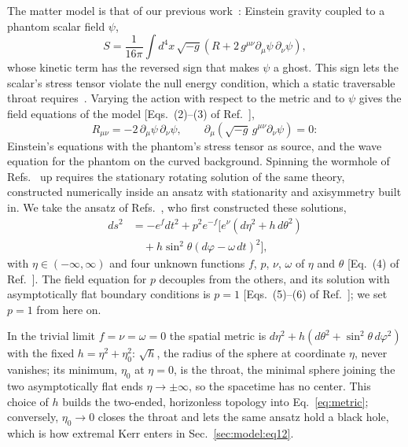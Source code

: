 \documentclass[twocolumn,floatfix,aps,prd,superscriptaddress,nofootinbib]{revtex4-2}
\begin{document}
The matter model is that of our previous work~\cite{shirokov2026,shirokov2026c}: Einstein gravity coupled to a phantom scalar field $\psi$,
\begin{equation}
S=\frac{1}{16\pi}\int d^4x\,\sqrt{-g}\left(R+2\,g^{\mu\nu}\partial_\mu\psi\,\partial_\nu\psi\right),
\label{eq:action}
\end{equation}
whose kinetic term has the reversed sign that makes $\psi$ a ghost. This sign lets the scalar's stress tensor violate the null energy condition, which a static traversable throat requires~\cite{morris_thorne1988,visser1995}. Varying the action with respect to the metric and to $\psi$ gives the field equations of the model [Eqs.~(2)--(3) of Ref.~\cite{chew2016}],
\begin{equation}
R_{\mu\nu}=-2\,\partial_\mu\psi\,\partial_\nu\psi,\qquad
\partial_\mu\!\left(\sqrt{-g}\,g^{\mu\nu}\partial_\nu\psi\right)=0:
\label{eq:fieldeqs}
\end{equation}
Einstein's equations with the phantom's stress tensor as source, and the wave equation for the phantom on the curved background. Spinning the wormhole of Refs.~\cite{shirokov2026,shirokov2026c} up requires the stationary rotating solution of the same theory, constructed numerically inside an ansatz with stationarity and axisymmetry built in. We take the ansatz of Refs.~\cite{kleihaus_kunz2014,chew2016}, who first constructed these solutions,
\begin{equation}
\begin{split}
ds^2&=-e^{f}dt^2+p^2e^{-f}\Big[e^{\nu}\left(d\eta^2+h\,d\theta^2\right)\\
&\quad+h\sin^2\!\theta\left(d\varphi-\omega\,dt\right)^2\Big],
\end{split}
\label{eq:metric}
\end{equation}
with $\eta\in(-\infty,\infty)$ and four unknown functions $f$, $p$, $\nu$, $\omega$ of $\eta$ and $\theta$ [Eq.~(4) of Ref.~\cite{chew2016}]. The field equation for $p$ decouples from the others, and its solution with asymptotically flat boundary conditions is $p=1$ [Eqs.~(5)--(6) of Ref.~\cite{chew2016}]; we set $p=1$ from here on.

In the trivial limit $f=\nu=\omega=0$ the spatial metric is $d\eta^2+h\left(d\theta^2+\sin^2\!\theta\,d\varphi^2\right)$ with the fixed $h=\eta^2+\eta_0^2$: $\sqrt{h}$, the radius of the sphere at coordinate $\eta$, never vanishes; its minimum, $\eta_0$ at $\eta=0$, is the throat, the minimal sphere joining the two asymptotically flat ends $\eta\to\pm\infty$, so the spacetime has no center. This choice of $h$ builds the two-ended, horizonless topology into Eq.~\eqref{eq:metric}; conversely, $\eta_0\to0$ closes the throat and lets the same ansatz hold a black hole, which is how extremal Kerr enters in Sec.~\ref{sec:model:eq12}.
\end{document}
